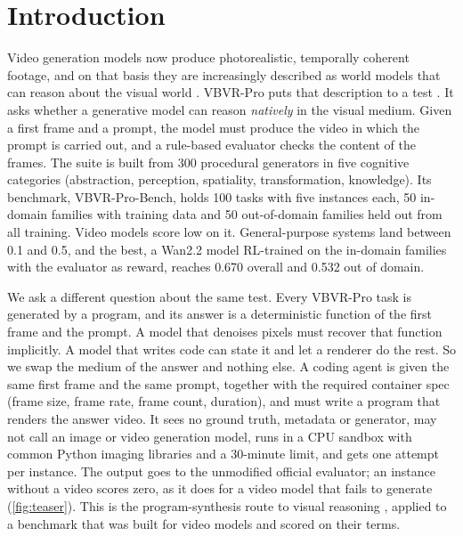 \section{Introduction}
\label{sec:intro}

Video generation models now produce photorealistic, temporally coherent footage, and on that basis they are increasingly described as world models that can reason about the visual world \citep{openai2024sora, deepmind2025veo3, wan2025wan, kuaishou2025kling, seedance2025}. VBVR-Pro puts that description to a test \citep{vbvrpro2026}. It asks whether a generative model can reason \emph{natively} in the visual medium. Given a first frame and a prompt, the model must produce the video in which the prompt is carried out, and a rule-based evaluator checks the content of the frames. The suite is built from 300 procedural generators in five cognitive categories (abstraction, perception, spatiality, transformation, knowledge). Its benchmark, VBVR-Pro-Bench, holds 100 tasks with five instances each, 50 in-domain families with training data and 50 out-of-domain families held out from all training. Video models score low on it. General-purpose systems land between 0.1 and 0.5, and the best, a Wan2.2 model RL-trained on the in-domain families with the evaluator as reward, reaches 0.670 overall and 0.532 out of domain.

We ask a different question about the same test. Every VBVR-Pro task is generated by a program, and its answer is a deterministic function of the first frame and the prompt. A model that denoises pixels must recover that function implicitly. A model that writes code can state it and let a renderer do the rest. So we swap the medium of the answer and nothing else. A coding agent is given the same first frame and the same prompt, together with the required container spec (frame size, frame rate, frame count, duration), and must write a program that renders the answer video. It sees no ground truth, metadata or generator, may not call an image or video generation model, runs in a CPU sandbox with common Python imaging libraries and a 30-minute limit, and gets one attempt per instance. The output goes to the unmodified official evaluator; an instance without a video scores zero, as it does for a video model that fails to generate (\cref{fig:teaser}). This is the program-synthesis route to visual reasoning \citep{gao2023pal, chen2023pot, suris2023vipergpt, gupta2023visprog}, applied to a benchmark that was built for video models and scored on their terms.

